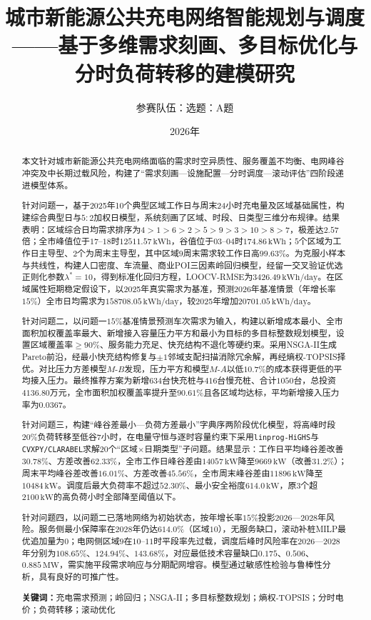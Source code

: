 \documentclass[a4paper,12pt]{ctexart}
\title{\bfseries 城市新能源公共充电网络智能规划与调度\\——基于多维需求刻画、多目标优化与分时负荷转移的建模研究}
\author{参赛队伍：\underline{\hspace{3cm}}\quad 选题：A题}
\date{2026年}
\begin{document}
\maketitle

\begin{abstract}
本文针对城市新能源公共充电网络面临的需求时空异质性、服务覆盖不均衡、电网峰谷冲突及中长期过载风险，构建了“需求刻画—设施配置—分时调度—滚动评估”四阶段递进模型体系。

针对问题一，基于2025年10个典型区域工作日与周末24小时充电量及区域基础属性，构建综合典型日与$5\!:\!2$加权日模型，系统刻画了区域、时段、日类型三维分布规律。结果表明：区域综合日均需求排序为$4>1>6>2>5>9>3>10>8>7$，极差达$2.57$倍；全市峰值位于$17\text{--}18$时$12511.57\,\mathrm{kWh}$，谷值位于$03\text{--}04$时$174.86\,\mathrm{kWh}$；$5$个区域为工作日主导型、$2$个为周末主导型，其中区域$9$周末需求较工作日高$99.63\%$。为克服小样本与共线性，构建人口密度、车流量、商业POI三因素岭回归模型，经留一交叉验证优选正则化参数$\lambda^{*}=10$，得到标准化回归方程，LOOCV-RMSE为$3426.49\,\mathrm{kWh/day}$。在区域属性短期稳定假设下，以2025年真实需求为基准，预测2026年基准情景（年增长率$15\%$）全市日均需求为$158708.05\,\mathrm{kWh/day}$，较2025年增加$20701.05\,\mathrm{kWh/day}$。

针对问题二，以问题一$15\%$基准情景预测车次需求为输入，构建以新增成本最小、全市面积加权覆盖率最大、新增接入容量压力平方和最小为目标的多目标整数规划模型，设置区域覆盖率$\ge 90\%$、服务能力充足、快充结构不退化等硬约束。采用NSGA-II生成Pareto前沿，经最小快充结构修复与$\pm1$邻域支配扫描消除冗余解，再经熵权-TOPSIS择优。对比压力方差模型$M\text{-}B$发现，压力平方和模型$M\text{-}A$以低$10.7\%$的成本获得更低的平均接入压力。最终推荐方案为新增$634$台快充桩与$416$台慢充桩、合计$1050$台，总投资$4136.80$万元，全市面积加权覆盖率提升至$90.61\%$且各区域均达标，平均新增接入压力率为$0.0367$。

针对问题三，构建“峰谷差最小—负荷方差最小”字典序两阶段优化模型，将高峰时段$20\%$负荷转移至低谷$7$小时，在电量守恒与逐时容量约束下采用\texttt{linprog-HiGHS}与\texttt{CVXPY/CLARABEL}求解$20$个“区域$\times$日期类型”子问题。结果显示：工作日平均峰谷差改善$30.78\%$、方差改善$62.33\%$，全市工作日峰谷差由$14057\,\mathrm{kW}$降至$9669\,\mathrm{kW}$（改善$31.2\%$）；周末平均峰谷差改善$16.01\%$、方差改善$45.56\%$，全市周末峰谷差由$11896\,\mathrm{kW}$降至$10484\,\mathrm{kW}$。调度后最大负荷率不超过$52.30\%$、最小安全裕度$614.0\,\mathrm{kW}$，原$3$个超$2100\,\mathrm{kW}$的高负荷小时全部降至阈值以下。

针对问题四，以问题二已落地网络为初始状态，按年增长率$15\%$投影2026—2028年风险。服务侧最小保障率在2028年仍达$614.0\%$（区域$10$），无服务缺口，滚动补桩MILP最优追加量为$0$；电网侧区域$9$在$10\text{--}11$时平段率先过载，调度后峰时风险率在2026—2028年分别为$108.65\%$、$124.94\%$、$143.68\%$，对应最低技术容量缺口$0.175$、$0.506$、$0.885\,\mathrm{MW}$，需实施平段需求响应与分期配网增容。模型通过敏感性检验与鲁棒性分析，具有良好的可推广性。

\textbf{关键词：}充电需求预测；岭回归；NSGA-II；多目标整数规划；熵权-TOPSIS；分时电价；负荷转移；滚动优化
\end{abstract}
\end{document}
